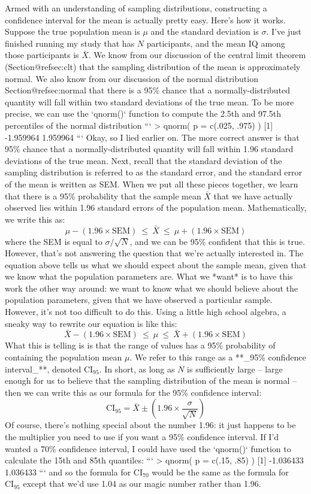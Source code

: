 Armed with an understanding of sampling distributions, constructing a confidence interval for the mean is actually pretty easy. Here's how it works. Suppose the true population mean is $\mu$ and the standard deviation is $\sigma$. I've just finished running my study that has $N$ participants, and the mean IQ among those participants is $\bar{X}$. We know from our discussion of the central limit theorem (Section@refsec:clt) that the sampling distribution of the mean is approximately normal. We also know from our discussion of the normal distribution Section@refsec:normal that there is a 95\% chance that a normally-distributed quantity will fall within two standard deviations of the true mean. To be more precise, we can use the `qnorm()` function to compute the 2.5th and 97.5th percentiles of the normal distribution
```
> qnorm( p = c(.025, .975) )
[1] -1.959964  1.959964
``` 
Okay, so I lied earlier on. The more correct answer is that 95\% chance that a normally-distributed quantity will fall within 1.96 standard deviations of the true mean. Next, recall that the standard deviation of the sampling distribution is referred to as the standard error, and the standard error of the mean is written as SEM. When we put all these pieces together, we learn that there is a 95\% probability that the sample mean $\bar{X}$ that we have actually observed lies within 1.96 standard errors of the population mean. Mathematically, we write this as:
$$
\mu - \left( 1.96 \times \mbox{SEM} \right) \ \leq \  \bar{X}\  \leq \  \mu + \left( 1.96 \times \mbox{SEM} \right) 
$$
where the SEM is equal to $\sigma / \sqrt{N}$, and we can be 95\% confident that this is true. However, that's not answering the question that we're actually interested in. The equation above tells us what we should expect about the sample mean, given that we know what the population parameters are. What we *want* is to have this work the other way around: we want to know what we should believe about the population parameters, given that we have observed a particular sample. However, it's not too difficult to do this. Using a little high school algebra, a sneaky way to rewrite our equation is like this:
$$
\bar{X} -  \left( 1.96 \times \mbox{SEM} \right) \ \leq \ \mu  \ \leq  \ \bar{X} +  \left( 1.96 \times \mbox{SEM}\right)
$$
What this is telling is is that the range of values has a 95\% probability of containing the population mean $\mu$. We refer to this range as a **_95\% confidence interval_**, denoted $\mbox{CI}_{95}$. In short, as long as $N$ is sufficiently large  -- large enough for us to believe that the sampling distribution of the mean is normal -- then we can write this as our formula for the 95\% confidence interval:
$$
\mbox{CI}_{95} = \bar{X} \pm \left( 1.96 \times \frac{\sigma}{\sqrt{N}} \right)
$$
Of course, there's nothing special about the number 1.96: it just happens to be the multiplier you need to use if you want a 95\% confidence interval. If I'd wanted a 70\% confidence interval, I could have used the `qnorm()` function to calculate the 15th and 85th quantiles:
```
> qnorm( p = c(.15, .85) )
[1] -1.036433  1.036433
```
and so the formula for $\mbox{CI}_{70}$ would be the same as the formula for $\mbox{CI}_{95}$ except that we'd use 1.04 as our magic number rather than 1.96.

